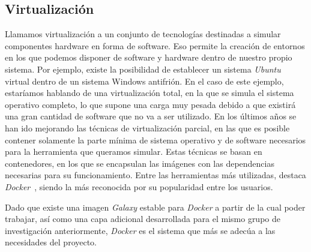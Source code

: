 \subsection{Virtualización}
Llamamos virtualización a un conjunto de tecnologías destinadas a simular componentes hardware en forma de software. Eso permite la creación de entornos en los que podemos disponer de software y hardware dentro de nuestro propio sistema. Por ejemplo, existe la posibilidad de establecer un sistema \textit{Ubuntu} virtual dentro de un sistema Windows antifrión. En el caso de este ejemplo, estaríamos hablando de una virtualización total, en la que se simula el sistema operativo completo, lo que supone una carga muy pesada debido a que existirá una gran cantidad de software que no va a ser utilizado. En los últimos años se han ido mejorando las técnicas de virtualización parcial, en las que es posible contener solamente la parte mínima de sistema operativo y de software necesarios para la herramienta que queramos simular. Estas técnicas se basan en contenedores, en los que se encapsulan las imágenes con las dependencias necesarias para su funcionamiento. Entre las herramientas más utilizadas, destaca \textit{Docker}~\cite{Docker}, siendo la más reconocida por su popularidad entre los usuarios.

Dado que existe una imagen \textit{Galaxy} estable para \textit{Docker} a partir de la cual poder trabajar, así como una capa adicional desarrollada para el mismo grupo de investigación anteriormente, \textit{Docker} es el sistema que más se adecúa a las necesidades del proyecto.


\newpage \thispagestyle{empty} %